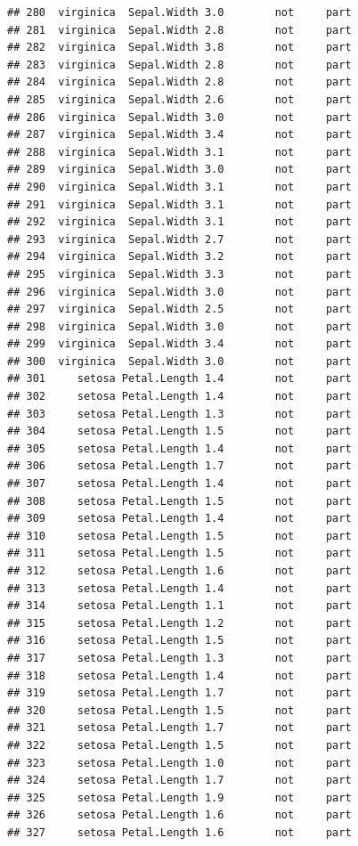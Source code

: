 \documentclass[krantz2]{krantz}\usepackage{knitr}%
\begin{document}
\begin{knitrout}
\begin{kframe}
\begin{verbatim}
## 280  virginica  Sepal.Width 3.0        not     part
## 281  virginica  Sepal.Width 2.8        not     part
## 282  virginica  Sepal.Width 3.8        not     part
## 283  virginica  Sepal.Width 2.8        not     part
## 284  virginica  Sepal.Width 2.8        not     part
## 285  virginica  Sepal.Width 2.6        not     part
## 286  virginica  Sepal.Width 3.0        not     part
## 287  virginica  Sepal.Width 3.4        not     part
## 288  virginica  Sepal.Width 3.1        not     part
## 289  virginica  Sepal.Width 3.0        not     part
## 290  virginica  Sepal.Width 3.1        not     part
## 291  virginica  Sepal.Width 3.1        not     part
## 292  virginica  Sepal.Width 3.1        not     part
## 293  virginica  Sepal.Width 2.7        not     part
## 294  virginica  Sepal.Width 3.2        not     part
## 295  virginica  Sepal.Width 3.3        not     part
## 296  virginica  Sepal.Width 3.0        not     part
## 297  virginica  Sepal.Width 2.5        not     part
## 298  virginica  Sepal.Width 3.0        not     part
## 299  virginica  Sepal.Width 3.4        not     part
## 300  virginica  Sepal.Width 3.0        not     part
## 301     setosa Petal.Length 1.4        not     part
## 302     setosa Petal.Length 1.4        not     part
## 303     setosa Petal.Length 1.3        not     part
## 304     setosa Petal.Length 1.5        not     part
## 305     setosa Petal.Length 1.4        not     part
## 306     setosa Petal.Length 1.7        not     part
## 307     setosa Petal.Length 1.4        not     part
## 308     setosa Petal.Length 1.5        not     part
## 309     setosa Petal.Length 1.4        not     part
## 310     setosa Petal.Length 1.5        not     part
## 311     setosa Petal.Length 1.5        not     part
## 312     setosa Petal.Length 1.6        not     part
## 313     setosa Petal.Length 1.4        not     part
## 314     setosa Petal.Length 1.1        not     part
## 315     setosa Petal.Length 1.2        not     part
## 316     setosa Petal.Length 1.5        not     part
## 317     setosa Petal.Length 1.3        not     part
## 318     setosa Petal.Length 1.4        not     part
## 319     setosa Petal.Length 1.7        not     part
## 320     setosa Petal.Length 1.5        not     part
## 321     setosa Petal.Length 1.7        not     part
## 322     setosa Petal.Length 1.5        not     part
## 323     setosa Petal.Length 1.0        not     part
## 324     setosa Petal.Length 1.7        not     part
## 325     setosa Petal.Length 1.9        not     part
## 326     setosa Petal.Length 1.6        not     part
## 327     setosa Petal.Length 1.6        not     part

\end{verbatim}
\end{kframe}
\end{knitrout}
\end{document}
